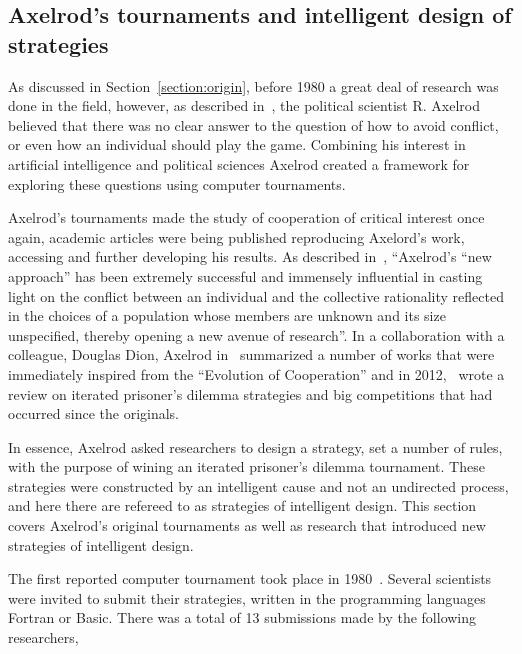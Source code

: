 \documentclass{article}
\theoremstyle{definition}
\begin{document}
\subsection{Axelrod's tournaments and intelligent design of strategies}\label{subsection:intelligent_design}

As discussed in Section~\ref{section:origin}, before 1980 a great deal of
research was done in the field, however, as described in~\cite{Axelrod2012}, the
political scientist R. Axelrod believed that there was no clear answer to the question
of how to avoid conflict, or even how an individual should play the game. Combining
his interest in artificial intelligence and political sciences Axelrod created a
framework for exploring these questions using computer tournaments.

Axelrod's tournaments made the study of cooperation of critical interest
once again, academic articles were being published reproducing Axelord's work,
accessing and further developing his results. As described in~\cite{Rapoport2015},
``Axelrod's “new approach” has been extremely
successful and immensely influential in casting light on the conflict between an
individual and the collective rationality reflected in the choices of a population
whose members are unknown and its size unspecified, thereby opening a new avenue
of research''.
In a collaboration with a colleague, Douglas Dion, Axelrod in~\cite{Axelrod1988}
summarized a number of works that were immediately inspired from the ``Evolution of Cooperation''
and in 2012,~\cite{Jurisic2012} wrote a review on iterated prisoner's
dilemma strategies and big competitions that had occurred since the originals.

In essence, Axelrod asked researchers to design a strategy,
set a number of rules, with the purpose of wining an iterated prisoner's dilemma
tournament. These strategies were constructed by an intelligent cause and not an
undirected process, and here there are refereed to as strategies of intelligent
design. This section covers Axelrod's original tournaments as well as 
research that introduced new strategies of intelligent design.

The first reported computer tournament took place in 1980~\cite{Axelrod1980a}.
Several scientists were invited to submit their strategies, written in the
programming languages Fortran or Basic. There was a total of 13 submissions
made by the following researchers,
\end{document}
